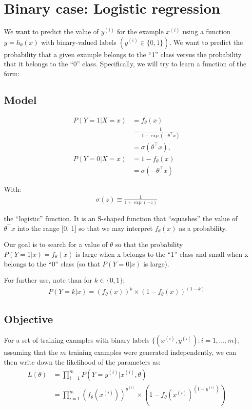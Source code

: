 \section{Binary case: Logistic regression} %
\label{sec:workflow}


We want to predict the value of $y^{(i)}$ for the example $x^{(i)}$ using a function $y = h_\theta(x) $ with binary-valued labels $\left(y^{(i)} \in \{0,1\}\right)$. We want to predict the probability that a given example belongs to the “1” class versus the probability that it belongs to the “0” class. Specifically, we will try to learn a function of the form:

\subsection{Model}
\begin{align}
	P(Y=1|X=x) &= f_\theta(x) \\
			   &= \frac{1}{1 + \exp(-\theta^\top x)} \\
			   &= \sigma(\theta^\top x),\\
	P(Y=0|X=x) &= 1 - f_\theta(x) \\
			   &= \sigma(-\theta^\top x)
\end{align}

With:
\begin{align}
	\sigma(z) \equiv \frac{1}{1 + \exp(-z)}
\end{align}

the “logistic” function. It is an S-shaped function that “squashes” the value of $\theta^\top x$ into the range [0, 1] so that we may interpret $f_\theta(x)$ as a probability. 

Our goal is to search for a value of $\theta$ so that the probability $P(Y=1|x) = f_\theta(x)$ is large when x belongs to the “1” class and small when x belongs to the “0” class (so that $P(Y=0|x)$ is large). 

For further use, note than for $k \in \{0,1\}$:
\begin{align}
	P(Y=k|x) = (f_\theta(x))^k \times (1 - f_\theta(x))^{(1-k)}
\end{align}

\subsection{Objective}
For a set of training examples with binary labels $\{ (x^{(i)}, y^{(i)}) : i=1,\ldots,m\}$, assuming that the $m$ training examples were generated independently, we can then write down the likelihood of the parameters as:
\begin{align}
	L(\theta) &= \prod_{i=1}^m P(Y=y^{(i)} | x^{(i)}, \theta) \\
			  &= \prod_{i=1}^m (f_\theta(x^{(i)}))^{y^{(i)}} \times (1 - f_\theta(x^{(i)})^{(1-y^{(i)})})
\end{align}

